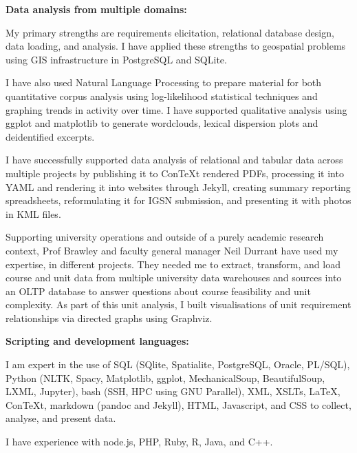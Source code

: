 \documentclass[11pt, a4paper]{awesome-cv}
\begin{document}
\begin{cvletter}

\textbf{Data analysis from multiple domains:} 

\begin{letteritems}
\item {My primary strengths are requirements elicitation, relational database design, data loading, and analysis. I have applied these strengths to geospatial problems using GIS infrastructure in PostgreSQL and SQLite.} 
\item {I have also used Natural Language Processing to prepare material for both quantitative corpus analysis using log-likelihood statistical techniques and graphing trends in activity over time. I have supported qualitative analysis using ggplot and matplotlib to
generate wordclouds, lexical dispersion plots and deidentified excerpts.} 
\item {I have successfully supported data analysis of relational and tabular data across multiple projects by publishing it to Con\TeX{}t rendered PDFs, processing it into YAML and rendering it into websites through Jekyll, creating summary reporting spreadsheets, reformulating it for IGSN submission, and presenting it with photos in KML files.}
\item {Supporting university operations and outside of a purely academic research context, Prof Brawley and faculty general manager Neil Durrant have used my expertise, in different projects. They needed me to extract, transform, and load course and unit data from multiple university data warehouses and sources into an OLTP database to answer questions about course feasibility and unit complexity. As part of this unit analysis, I built visualisations of unit requirement relationships via directed graphs using Graphviz.}
\end{letteritems}



\textbf{Scripting and development languages:} 
\begin{letteritems}
\item {I am expert in the use of SQL (SQlite, Spatialite, PostgreSQL, Oracle, PL/SQL), Python (NLTK, Spacy, Matplotlib, ggplot, MechanicalSoup, BeautifulSoup, LXML, Jupyter), bash (SSH, HPC using GNU Parallel), XML, XSLTs, \LaTeX, Con\TeX{}t, markdown (pandoc and Jekyll), HTML, Javascript, and CSS to collect, analyse, and present data.} 
\item {I have experience with node.js, PHP, Ruby, R, Java, and C++. }
\end{letteritems}


\end{cvletter}
\end{document}
